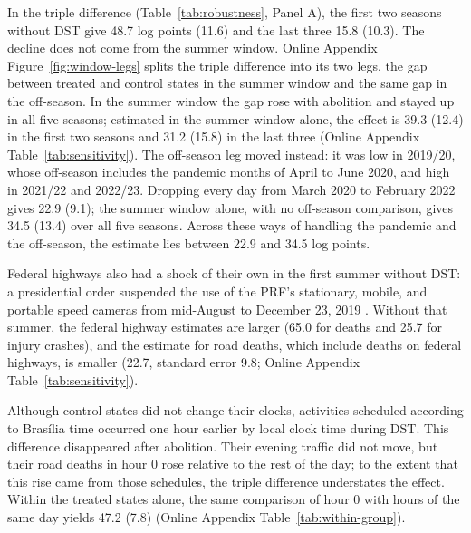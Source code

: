 In the triple difference (Table~\ref{tab:robustness}, Panel A), the first two seasons without DST give 48.7 log points (11.6) and the last three 15.8 (10.3). The decline does not come from the summer window. Online Appendix Figure~\ref{fig:window-legs} splits the triple difference into its two legs, the gap between treated and control states in the summer window and the same gap in the off-season. In the summer window the gap rose with abolition and stayed up in all five seasons; estimated in the summer window alone, the effect is 39.3 (12.4) in the first two seasons and 31.2 (15.8) in the last three (Online Appendix Table~\ref{tab:sensitivity}). The off-season leg moved instead: it was low in 2019/20, whose off-season includes the pandemic months of April to June 2020, and high in 2021/22 and 2022/23. Dropping every day from March 2020 to February 2022 gives 22.9 (9.1); the summer window alone, with no off-season comparison, gives 34.5 (13.4) over all five seasons. Across these ways of handling the pandemic and the off-season, the estimate lies between 22.9 and 34.5 log points.

Federal highways also had a shock of their own in the first summer without DST: a presidential order suspended the use of the PRF's stationary, mobile, and portable speed cameras from mid-August to December 23, 2019 \citep{brasil2019despacho, poder3602019radares}. Without that summer, the federal highway estimates are larger (65.0 for deaths and 25.7 for injury crashes), and the estimate for road deaths, which include deaths on federal highways, is smaller (22.7, standard error 9.8; Online Appendix Table~\ref{tab:sensitivity}).

Although control states did not change their clocks, activities scheduled according to Bras\'ilia time occurred one hour earlier by local clock time during DST. This difference disappeared after abolition. Their evening traffic did not move, but their road deaths in hour 0 rose relative to the rest of the day; to the extent that this rise came from those schedules, the triple difference understates the effect. Within the treated states alone, the same comparison of hour 0 with hours of the same day yields 47.2 (7.8) (Online Appendix Table~\ref{tab:within-group}).

